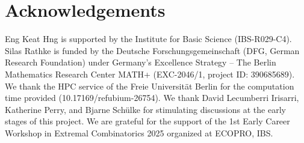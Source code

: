 \documentclass[12pt]{article}
\theoremstyle{plain}
\theoremstyle{definition}
\begin{document}
	\section*{Acknowledgements}
	
	Eng Keat Hng is supported by the Institute for Basic Science (IBS-R029-C4). Silas Rathke is funded by the Deutsche Forschungsgemeinschaft (DFG, German Research Foundation) under Germany's Excellence Strategy – The Berlin Mathematics Research Center MATH+ (EXC-2046/1, project ID: 390685689). We thank the HPC service of the Freie Universit\"at Berlin for the computation time provided (10.17169/refubium-26754). We thank David Lecumberri Irisarri, Katherine Perry, and Bjarne Schülke for stimulating discussions at the early stages of this project. We are grateful for the support of the 1st Early Career Workshop in Extremal Combinatorics 2025 organized at ECOPRO, IBS.
	
	
	
	
\end{document}
